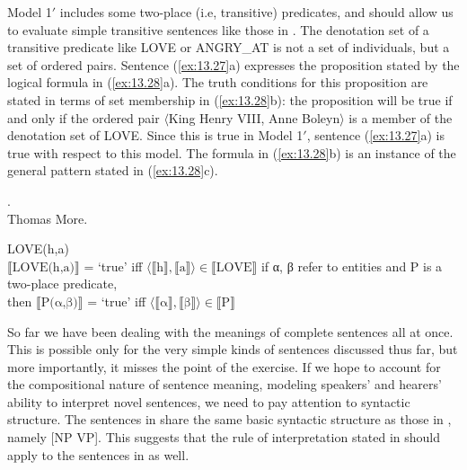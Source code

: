 Model 1$'$ includes some two-place (i.e, transitive) predicates, and should allow us to evaluate simple transitive sentences like those in . The denotation set of a transitive predicate like LOVE or ANGRY\_AT is not a set of individuals, but a set of ordered pairs. Sentence (\ref{ex:13.27}a) expresses the proposition stated by the logical formula in (\ref{ex:13.28}a). The truth conditions for this proposition are stated in terms of set membership in (\ref{ex:13.28}b): the proposition will be true if and only if the ordered pair $\langle$King Henry VIII, Anne Boleyn$\rangle$ is a member of the denotation set of LOVE. Since this is true in Model 1$'$, sentence (\ref{ex:13.27}a) is true with respect to this model. The formula in (\ref{ex:13.28}b) is an instance of the general pattern stated in (\ref{ex:13.28}c).


\ea \label{ex:13.27}
.\\
  {Thomas More}.
                       \z
\z

\ea \label{ex:13.28}
\ea  LOVE(h,a)\\
\ex  $\llbracket\text{LOVE(h,a)}\rrbracket$  = ‘true’  
    iff  
    $\langle\llbracket\text{h}\rrbracket,\llbracket\text{a}\rrbracket \rangle {\in} \llbracket\text{LOVE}\rrbracket$ 
\ex  if α, β refer to entities and P is a two-place predicate,\\
  then  $\llbracket\text{P(α,β)}\rrbracket$  = ‘true’  
  iff  
  $\langle\llbracket\text{α}\rrbracket,\llbracket\text{β}\rrbracket \rangle {\in} \llbracket\text{P}\rrbracket$ 
\z \z


So far we have been dealing with the meanings of complete sentences all at once. This is possible only for the very simple kinds of sentences discussed thus far, but more importantly, it misses the point of the exercise. If we hope to account for the compositional nature of sentence meaning, modeling speakers’ and hearers’ ability to interpret novel sentences, we need to pay attention to syntactic structure. The sentences in  share the same basic syntactic structure as those in , namely [NP VP]. This suggests that the rule of interpretation stated in  should apply to the sentences in  as well.



